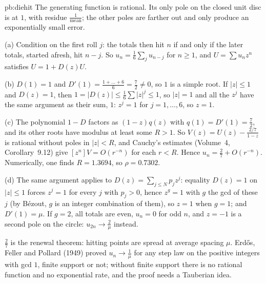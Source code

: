 \begin{solution}{pb:diehit}
\idea The generating function is rational. Its only pole on the closed unit disc is at $1$, with residue $\frac1{\text{mean}}$; the other poles are farther out and only produce an
exponentially small error.

\writeup (a) Condition on the first roll $j$: the totals then hit $n$ if and only if the later totals, started afresh, hit $n-j$. So $u_n=\frac16\sum_ju_{n-j}$ for $n\ge1$, and $U=\sum u_nz^n$ satisfies
$U=1+D(z)U$.

(b) $D(1)=1$ and $D'(1)=\frac{1+\dots+6}6=\frac72\ne0$, so $1$ is a simple root. If $|z|\le1$ and $D(z)=1$, then $1=|D(z)|\le\frac16\sum|z|^j\le1$, so $|z|=1$ and all the $z^j$ have the same argument
as their sum, $1$: $z^j=1$ for $j=1,\dots,6$, so $z=1$.

(c) The polynomial $1-D$ factors as $(1-z)q(z)$ with $q(1)=D'(1)=\frac72$, and its other roots have modulus at least some $R>1$. So $V(z)=U(z)-\frac{2/7}{1-z}$ is rational without poles in
$|z|<R$, and Cauchy's estimates (Volume~4, Corollary~9.12) give $[z^n]V=O(r^{-n})$ for each $r<R$. Hence $u_n=\frac27+O(r^{-n})$. Numerically, one finds $R=1.3694$, so $\rho=0.7302$.

(d) The same argument applies to $D(z)=\sum_{j\le N}p_jz^j$: equality $D(z)=1$ on $|z|\le1$ forces $z^j=1$ for every $j$ with $p_j>0$, hence $z^g=1$ with $g$ the gcd of these $j$ (by B\'ezout, $g$ is an integer
combination of them), so $z=1$ when $g=1$; and $D'(1)=\mu$. If $g=2$, all totals are even, $u_n=0$ for odd $n$, and $z=-1$ is a second pole on the circle: $u_{2n}\to\frac2\mu$ instead.

\leads $\frac27$ is the renewal theorem: hitting points are spread at average spacing $\mu$. Erd\H os, Feller and Pollard (1949) proved $u_n\to\frac1\mu$ for any step law on the positive integers
with gcd $1$, finite support or not; without finite support there is no rational function and no exponential rate, and the proof needs a Tauberian idea.
\end{solution}

